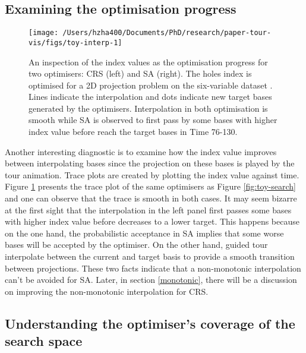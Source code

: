 \hypertarget{toy-interp}{%
\subsection{Examining the optimisation progress}\label{toy-interp}}

\begin{Schunk}
\begin{figure}

{\centering \texttt{[image: /Users/hzha400/Documents/PhD/research/paper-tour-vis/figs/toy-interp-1]} 

}

\caption[An inspection of the index values as the optimisation progress for two optimisers]{An inspection of the index values as the optimisation progress for two optimisers: CRS (left) and SA (right). The holes index is optimised for a 2D projection problem on the six-variable dataset . Lines indicate the interpolation and dots indicate new target bases generated by the optimisers. Interpolation in both optimisation is smooth while SA is observed to first pass by some bases with higher index value before reach the target bases in Time 76-130.}\label{fig:toy-interp}
\end{figure}
\end{Schunk}

Another interesting diagnostic is to examine how the index value
improves between interpolating bases since the projection on these bases
is played by the tour animation. Trace plots are created by plotting the
index value against time. Figure \ref{fig:toy-interp} presents the trace
plot of the same optimisers as Figure \ref{fig:toy-search} and one can
observe that the trace is smooth in both cases. It may seem bizarre at
the first sight that the interpolation in the left panel first passes
some bases with higher index value before decreases to a lower target.
This happens because on the one hand, the probabilistic acceptance in SA
implies that some worse bases will be accepted by the optimiser. On the
other hand, guided tour interpolate between the current and target basis
to provide a smooth transition between projections. These two facts
indicate that a non-monotonic interpolation can't be avoided for SA.
Later, in section \ref{monotonic}, there will be a discussion on
improving the non-monotonic interpolation for CRS.

\hypertarget{toy-pca}{%
\subsection{Understanding the optimiser's coverage of the search
space}\label{toy-pca}}

